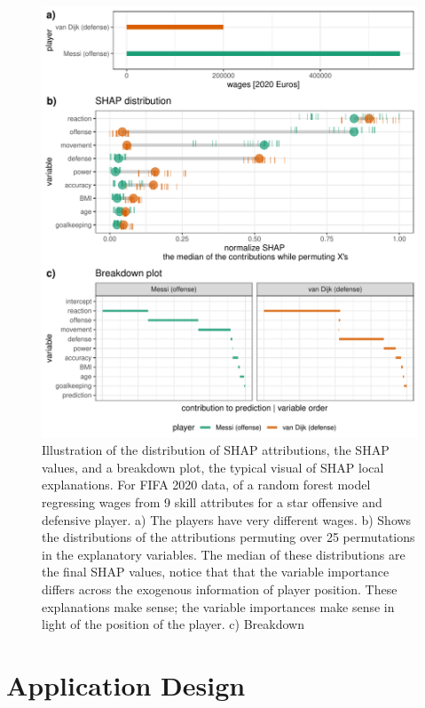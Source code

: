 \documentclass[
]{article}
\begin{document}
\begin{figure}

{\centering \includegraphics{./figures/shap_distr_bd} 

}

\caption{Illustration of the distribution of SHAP attributions, the SHAP values, and a breakdown plot, the typical visual of SHAP local explanations. For FIFA 2020 data, of a random forest model regressing wages from 9 skill attributes for a star offensive and defensive player. a) The players have very different wages. b) Shows the distributions of the attributions permuting over 25 permutations in the explanatory variables. The median of these distributions are the final SHAP values, notice that that the variable importance differs across the exogenous information of player position. These explanations make sense; the variable importances make sense in light of the position of the player. c) Breakdown }\label{fig:shapdistrbd}
\end{figure}

\hypertarget{sec:applicationdesign}{%
\section{Application Design}\label{sec:applicationdesign}}
\end{document}
